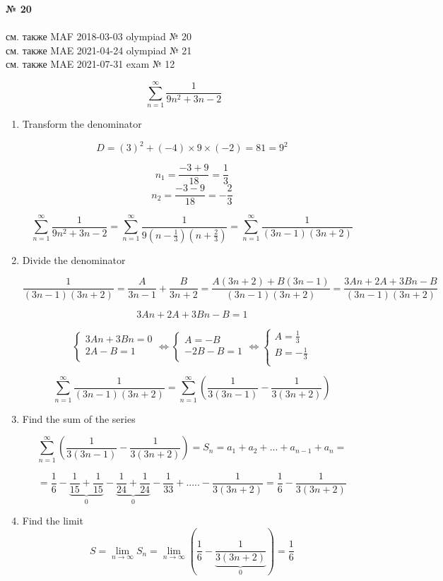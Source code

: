 \documentclass{article}
\begin{document}
\textbf{№ 20} 
\\
\\ см. также {\color{blue}MAF} 2018-03-03 olympiad № 20
\\ см. также {\color{red}MAE} 2021-04-24 olympiad № 21
\\ см. также {\color{red}MAE} 2021-07-31 exam № 12

$$ \sum_{n=1}^{\infty} \frac{1}{9n^2+3n-2} $$

\begin{enumerate}

\item Transform the denominator

$$ D = (3)^2 + (-4)\times9\times(-2)=81=9^2 $$

$$ n_1 = \frac{-3+9}{18}=\frac{1}{3} $$
$$ n_2 = \frac{-3-9}{18}=-\frac{2}{3} $$

$$\sum_{n=1}^{\infty} \frac{1}{9n^2+3n-2} 
= \sum_{n=1}^{\infty} \frac{1}{9(n-\frac{1}{3})(n+\frac{2}{3})} 
= \sum_{n=1}^{\infty} \frac{1}{(3n-1)(3n+2)}$$

\item Divide the denominator

$$\frac{1}{(3n-1)(3n+2)} 
= \frac{A}{3n-1} + \frac{B}{3n+2} 
= \frac{A(3n+2)+B(3n-1)}{(3n-1)(3n+2)} 
= \frac{3An+2A+3Bn-B}{(3n-1)(3n+2)}$$

$$ 3An+2A+3Bn-B = 1 $$

$$
\left\{
  \begin{array}{ccc}
    3An + 3Bn = 0 \\
    2A-B = 1 \\
  \end{array}\Leftrightarrow
\right.
\left\{
  \begin{array}{ccc}
    A = -B \\
    -2B - B = 1 \\
  \end{array}\Leftrightarrow
\right.
\left\{
  \begin{array}{ccc}
    A = \frac{1}{3} \\
    B = -\frac{1}{3} \\
  \end{array}
\right.
$$

$$ \sum_{n=1}^{\infty} \frac{1}{(3n-1)(3n+2)} 
= \sum_{n=1}^{\infty} \left(\frac{1}{3(3n-1)} - \frac{1}{3(3n+2)}\right) $$

\item Find the sum of the series

$$ \sum_{n=1}^{\infty} \left(\frac{1}{3(3n-1)} - \frac{1}{3(3n+2)}\right) 
= S_n = a_1+a_2+...+a_{n-1}+a_n 
= $$

$$ = \frac{1}{6} - \underbrace{\frac{1}{15} + \frac{1}{15}}_{0} - \underbrace{\frac{1}{24} + \frac{1}{24}}_{0} - \frac{1}{33} + ..... - \frac{1}{3(3n+2)} 
= \frac{1}{6} - \frac{1}{3(3n+2)} $$

\item Find the limit
$$S = \lim_{n\to\infty} S_n 
= \lim_{n\to\infty} \left(\frac{1}{6} - \underbrace{\frac{1}{3(3n+2)}}_{0}\right) 
= \frac{1}{6} $$


\end{enumerate}
\end{document}
